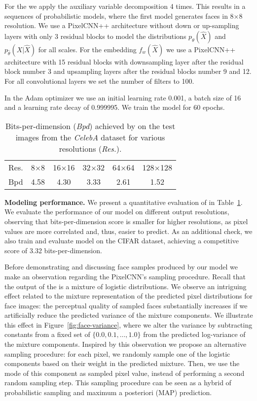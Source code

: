 For the \PYRAMID we apply the auxiliary variable decomposition 4 times.
This results in a sequences of probabilistic models, where the first model generates 
faces in 8$\times$8 resolution. We use a PixelCNN++ architecture without down or up-sampling layers with 
only 3 residual blocks to model the distributions $p_{\theta}(\widehat{X})$ and $p_{\hat{\theta}}(X|\widehat{X})$
for all scales.
For the embedding $f_w(\widehat{X})$ we use a PixelCNN++ architecture with
15 residual blocks with downsampling layer after the residual block 
number 3 and upsampling layers after the residual blocks number 9 and 12.
For all convolutional layers we set the number of filters to 100.

In the Adam optimizer we use an initial learning rate 0.001, a batch 
size of 16 and a learning rate decay of 0.999995.
We train the model for 60 epochs.

\begin{table}[t]
	\center
        \begin{tabular}{|l||c|c|c|c|c|}
        \hline
		Res. & 8$\times$8 & 16$\times$16 & 32$\times$32  & 64$\times$64 & 128$\times$128 \\
		Bpd  & 4.58 & 4.30 & 3.33 & 2.61 & 1.52 \\
	\hline
	\end{tabular}
	\caption{Bits-per-dimension (\emph{Bpd}) achieved by \PYRAMID on the test images
	         from the \emph{CelebA} dataset for various resolutions (\emph{Res.}).}
	\label{table:CelebA}
\end{table}

\textbf{Modeling performance.}
We present a quantitative evaluation of \PYRAMID in Table~\ref{table:CelebA}.
We evaluate the performance of our model on different output resolutions,
observing that bits-per-dimension score is smaller for higher resolutions,
as pixel values are more correlated and, thus, easier to predict.
As an additional check, we also train and evaluate \PYRAMID model on
the CIFAR dataset, achieving a competitive score of 3.32 bits-per-dimension.

Before demonstrating and discussing face samples produced by our model 
we make an observation regarding the PixelCNN's sampling procedure.
Recall that the output of the \PYRAMID is a mixture of logistic 
distributions.
We observe an intriguing effect related to the mixture representation 
of the predicted pixel distributions for face images:
the perceptual quality of sampled faces substantially increases if 
we artificially reduce the predicted variance of the mixture components.
We illustrate this effect in Figure~\ref{fig:face-variance}, where 
we alter the variance by subtracting constants from a fixed set 
of $\{0.0, 0.1, \dots, 1.0\}$ from the predicted log-variance of 
the mixture components.
Inspired by this observation we propose an alternative sampling procedure: 
for each pixel, we randomly sample one of the logistic components based 
on their weight in the predicted mixture. Then, we use the mode of this 
component as sampled pixel value, instead of performing a second random 
sampling step.
This sampling procedure can be seen as a hybrid of 
probabilistic sampling and maximum a posteriori (MAP) prediction. 

